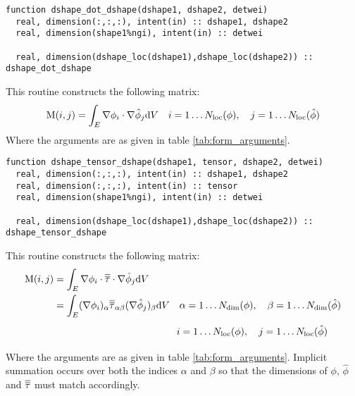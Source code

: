 \documentclass[a4paper, 11pt]{book}
\begin{document}

\begin{lstlisting}
function dshape_dot_dshape(dshape1, dshape2, detwei)
  real, dimension(:,:,:), intent(in) :: dshape1, dshape2
  real, dimension(shape1%ngi), intent(in) :: detwei

  real, dimension(dshape_loc(dshape1),dshape_loc(dshape2)) :: dshape_dot_dshape
\end{lstlisting}

This routine constructs the following matrix:
\begin{equation}
  \mathrm{M}(i,j)=\int_E \nabla\phi_{i}\cdot\nabla\hat{\phi}_{j}\mathrm{d} V\quad
  i=1\ldots N_\mathrm{loc}(\phi),\quad j=1\ldots N_\mathrm{loc}(\hat{\phi}) 
\end{equation}
Where the arguments are as given in table \ref{tab:form_arguments}.



\begin{lstlisting}
function dshape_tensor_dshape(dshape1, tensor, dshape2, detwei)
  real, dimension(:,:,:), intent(in) :: dshape1, dshape2
  real, dimension(:,:,:), intent(in) :: tensor
  real, dimension(shape1%ngi), intent(in) :: detwei

  real, dimension(dshape_loc(dshape1),dshape_loc(dshape2)) :: dshape_tensor_dshape
\end{lstlisting}

This routine constructs the following matrix:
\begin{equation}
  \begin{split}
    \mat{M}(i,j)&=\int_E \grad\phi_{i}\dot\tensor\tau\dot\grad\hat{\phi}_{j}\d
    V\\
    &=\int_E (\grad\phi_{i})_\alpha\tensor{\tau}_{\alpha\beta}
    (\grad\hat{\phi}_{j})_\beta\d V 
    \quad \alpha=1\ldots\Ndim(\phi),\quad \beta=1\ldots\Ndim(\hat{\phi})\\
    &\phantom{=\int_E (\grad\phi_{i})_\alpha\tensor{\tau}_{\alpha\beta}
    (\grad\hat{\phi}_{j})_\beta\d V}
    \quad i=1\ldots\Nloc(\phi),\quad j=1\ldots\Nloc(\hat{\phi})\\
  \end{split}
\end{equation}
Where the arguments are as given in table \ref{tab:form_arguments}. Implicit
summation occurs over both the indices $\alpha$ and $\beta$ so that the
dimensions of $\phi$, $\hat{\phi}$ and $\overline{\overline{\tau}}$ must match accordingly.
\end{document}
